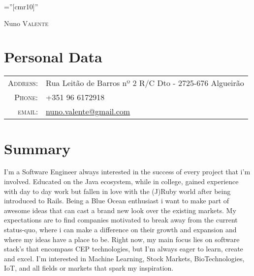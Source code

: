 \documentclass[a4paper,10pt]{article}
\begin{document}
\pagestyle{empty} %

\font\fb=''[cmr10]'' %

\par{\centering
  {\Huge Nuno \textsc{Valente}
}\bigskip\par}

\section{Personal Data}

\begin{tabular}{rl}
    \textsc{Address:}   & Rua Leitão de Barros nº 2 R/C Dto - 2725-676 Algueirão\\
    \textsc{Phone:}     & +351 96 6172918\\
    \textsc{email:}     & \href{mailto:nuno.valente@gmail.com}{nuno.valente@gmail.com} \\
\end{tabular}

\section{Summary}
I'm a Software Engineer always interested in the success of every project that i'm involved.
Educated on the Java ecosystem, while in college, gained experience with day to day work but fallen in love with the (J)Ruby world after being introduced to Rails.
Being a Blue Ocean enthusiast i want to make part of awesome ideas that can cast a brand new look over the existing markets.
My expectations are to find companies motivated to break away from the current status-quo, where i can make a difference on their growth and expansion and where my ideas have a place to be.
Right now, my main focus lies on software stack's that encompass CEP technologies, but  I'm always eager to learn, create and excel. 
I'm interested in Machine Learning, Stock Markets, BioTechnologies, IoT, and all fields or markets that spark my inspiration.

\end{document}
